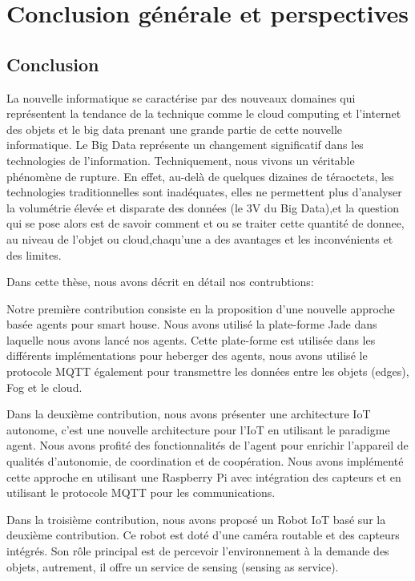 \chapter*{Conclusion générale et perspectives}
\section*{Conclusion}

La nouvelle informatique se caractérise par des nouveaux domaines qui représentent la tendance de la technique comme le cloud computing et l'internet des objets et le big data prenant une grande partie de cette nouvelle informatique. Le Big Data représente un changement significatif dans les technologies de l'information. Techniquement, nous vivons un véritable phénomène de rupture. En effet, au-delà de quelques dizaines de téraoctets, les technologies traditionnelles sont inadéquates, elles ne permettent plus d'analyser la volumétrie élevée et disparate des données (le 3V du Big Data),et la question qui se pose alors est de savoir comment et ou se traiter cette quantité de donnee,  au niveau de l'objet ou cloud,chaqu'une a des avantages et les inconvénients et des limites.

Dans cette thèse, nous avons décrit en détail nos contrubtions: 

Notre première contribution consiste en la proposition  d'une nouvelle approche basée agents pour smart house. Nous avons utilisé la plate-forme Jade dans laquelle nous avons lancé nos agents. Cette plate-forme  est utilisée dans les différents implémentations pour heberger des agents, nous avons utilisé le protocole MQTT  également pour transmettre les données entre les objets (edges), Fog et le cloud.

Dans la deuxième contribution, nous avons présenter une architecture IoT autonome, c'est une nouvelle architecture pour l'IoT en utilisant le paradigme agent. Nous avons profité des fonctionnalités de l'agent pour enrichir l'appareil de qualités d'autonomie, de coordination et de coopération. Nous avons implémenté cette approche en utilisant une Raspberry Pi avec intégration des capteurs et en utilisant le protocole MQTT pour les communications.

Dans  la troisième contribution, nous avons proposé un Robot IoT basé sur la deuxième contribution. Ce robot est doté d’une  caméra routable et des capteurs intégrés. Son rôle principal est de  percevoir l’environnement à la demande des objets, autrement, il offre un service de sensing (sensing as service).

